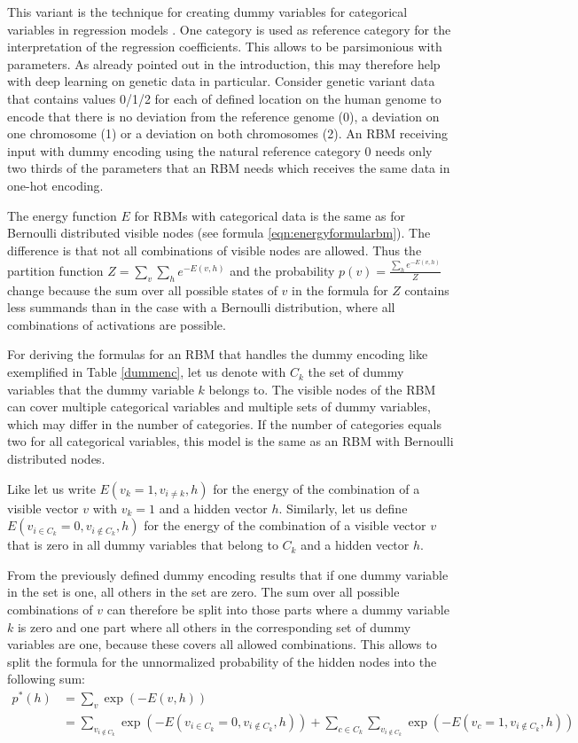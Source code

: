 \documentclass[12pt]{article}
\begin{document}
This variant is the technique for creating dummy variables for categorical variables in regression models \citep{faraway_regression}.
One category is used as reference category for the interpretation of the regression coefficients.
This allows to be parsimonious with parameters.
As already pointed out in the introduction, this may therefore help with deep learning on genetic data in particular.
Consider genetic variant data that contains values 0/1/2 for each of defined location on the human genome to encode that there is no deviation from the reference genome (0), a deviation on one chromosome (1) or a deviation on both chromosomes (2).
An RBM receiving input with dummy encoding using the natural reference category 0 needs only two thirds of the parameters that an RBM needs which receives the same data in one-hot encoding.

The energy function $E$ for RBMs with categorical data is the same as for Bernoulli distributed visible nodes (see formula \ref{eqn:energyformularbm}).
The difference is that not all combinations of visible nodes are allowed. Thus the partition function $Z = \sum_{v} \sum_{h} e^{-E(v,h)}$ and the probability
$p(v) = \frac{\sum_h e^{-E(v,h)}}{Z}$ change because the sum over all possible states of $v$ in the formula for $Z$ contains less summands than in the case with a Bernoulli distribution, where all combinations of activations are possible.

For deriving the formulas for an RBM that handles the dummy encoding like exemplified in Table \ref{dummenc}, let us denote with $C_k$ the set of dummy variables that the dummy variable $k$ belongs to.
The visible nodes of the RBM can cover multiple categorical variables and multiple sets of dummy variables, which may differ in the number of categories.
If the number of categories equals two for all categorical variables, this model is the same as an RBM with Bernoulli distributed nodes.

Like \cite{krizhevsky2009tinyimagesthesis} let us write $E(v_k = 1, v_{i \neq k}, h)$ for the energy of the combination of a visible vector $v$ with $v_k = 1$ and a hidden vector $h$. Similarly, let us define $E(v_{i \in C_k} = 0, v_{i \notin C_k}, h)$ for the energy of the combination of a visible vector $v$ that is zero in all dummy variables that belong to $C_k$ and a hidden vector $h$.

From the previously defined dummy encoding results that if one dummy variable in the set is one, all others in the set are zero.
The sum over all possible combinations of $v$ can therefore be split into those parts where a dummy variable $k$ is zero and one part where all others in the corresponding set of dummy variables are one, because these covers all allowed combinations.
This allows to split the formula for the unnormalized probability of the hidden nodes into the following sum:
\begin{align}
p^*(h) &= \sum_v  \exp (-E(v,h)) \nonumber \\
&= \sum_{v_{i \notin C_k}} \exp (-E(v_{i \in C_k} = 0, v_{i \notin C_k}, h)) + \sum_{c \in C_k} \sum_{v_{i \notin C_k}} \exp ( - E(v_c = 1, v_{i \notin C_k},  h))
\end{align}
\end{document}

